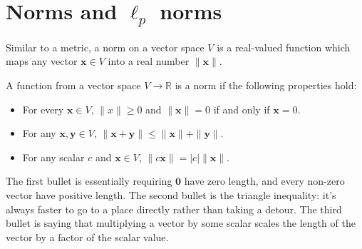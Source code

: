 \documentclass[12pt]{article}
\begin{document}
\section{Norms and $\ell_p$ norms}
Similar to a metric, a norm on a vector space $V$ is a real-valued function which maps any vector $\mathbf{x}\in V$ into a real number $\|\mathbf{x}\|$. 
\begin{definition}
A function from a vector space $V\to \mathbb{R}$ is a norm if the following properties hold:
\begin{itemize}
\item For every $\mathbf{x}\in V$, $\|x\|\geqslant 0$ and $\|\mathbf{x}\|=0$ if and only if $\mathbf{x} = 0$.
\item For any $\mathbf{x},\mathbf{y}\in V$, $\|\mathbf{x}+\mathbf{y}\|\leqslant \|\mathbf{x}\|+\|\mathbf{y}\|$. \item For any scalar $c$ and $\mathbf{x}\in V$, $\|c\mathbf{x}\| = |c|\|\mathbf{x}\|$. \end{itemize}
\end{definition}
\noindent The first bullet is essentially requiring $\mathbf{0}$ have zero length, and every non-zero vector have positive length. The second bullet is the triangle inequality: it's always faster to go to a place directly rather than taking a detour. The third bullet is saying that multiplying a vector by some scalar scales the length of the vector by a factor of the scalar value.
\end{document}
